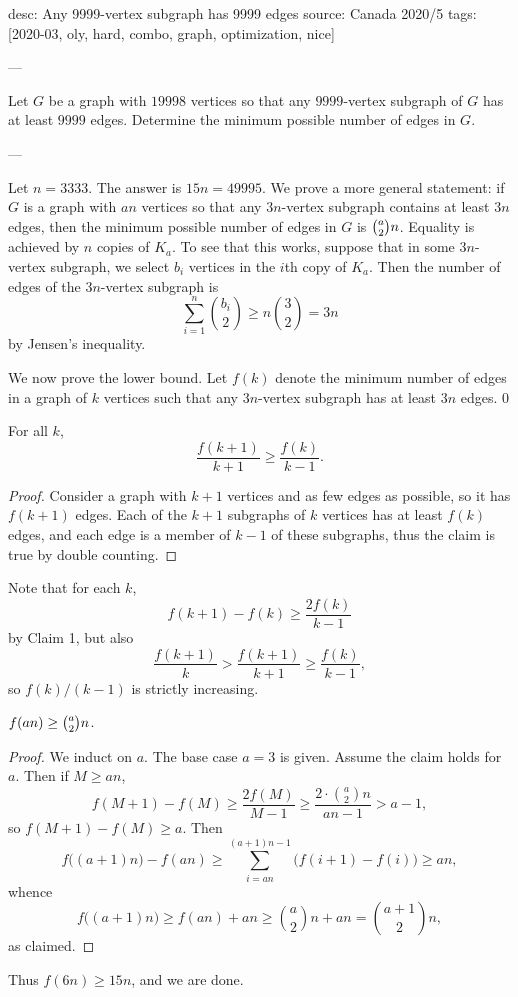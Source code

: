 desc: Any 9999-vertex subgraph has 9999 edges
source: Canada 2020/5
tags: [2020-03, oly, hard, combo, graph, optimization, nice]

---

Let $G$ be a graph with $19998$ vertices so that any $9999$-vertex subgraph of $G$ has at least $9999$ edges. Determine the minimum possible number of edges in $G$.

---

Let $n=3333$. The answer is $15n=49995$. We prove a more general statement: if $G$ is a graph with $an$ vertices so that any $3n$-vertex subgraph contains at least $3n$ edges, then the minimum possible number of edges in $G$ is $\tbinom a2n$. Equality is achieved by $n$ copies of $K_a$. To see that this works, suppose that in some $3n$-vertex subgraph, we select $b_i$ vertices in the $i$th copy of $K_a$. Then the number of edges of the $3n$-vertex subgraph is \[\sum_{i=1}^n\binom{b_i}2\ge n\binom32=3n\]
by Jensen's inequality.

We now prove the lower bound. Let $f(k)$ denote the minimum number of edges in a graph of $k$ vertices such that any $3n$-vertex subgraph has at least $3n$ edges.
\setcounter{claim}0
\begin{claim}
    For all $k$, \[\frac{f(k+1)}{k+1}\ge\frac{f(k)}{k-1}.\]
\end{claim}
\begin{proof}
    Consider a graph with $k+1$ vertices and as few edges as possible, so it has $f(k+1)$ edges. Each of the $k+1$ subgraphs of $k$ vertices has at least $f(k)$ edges, and each edge is a member of $k-1$ of these subgraphs, thus the claim is true by double counting.
\end{proof}

Note that for each $k$, \[f(k+1)-f(k)\ge\frac{2f(k)}{k-1}\]
by Claim 1, but also \[\frac{f(k+1)}k>\frac{f(k+1)}{k+1}\ge\frac{f(k)}{k-1},\]
so $f(k)/(k-1)$ is strictly increasing.
\begin{claim}
    $f(an)\ge\tbinom a2n$.
\end{claim}
\begin{proof}
    We induct on $a$. The base case $a=3$ is given. Assume the claim holds for $a$. Then if $M\ge an$, \[f(M+1)-f(M)\ge\frac{2f(M)}{M-1}\ge\frac{2\cdot\binom a2n}{an-1}>a-1,\]
    so $f(M+1)-f(M)\ge a$. Then \[f\big( (a+1)n\big)-f(an)\ge\sum_{i=an}^{(a+1)n-1}\big(f(i+1)-f(i)\big)\ge an,\]
    whence \[f\big( (a+1)n\big)\ge f(an)+an\ge\binom a2n+an=\binom{a+1}2n,\]
    as claimed.
\end{proof}

Thus $f(6n)\ge15n$, and we are done.
